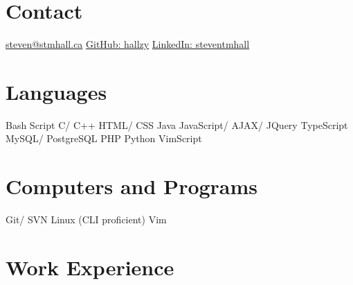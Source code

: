 \documentclass[]{friggeri-cv} %
\begin{document}


\begin{aside} %
\section{Contact}
\href{mailto:steven@stmhall.ca}{steven@stmhall.ca}
\href{http://github.com/hallzy}{GitHub: hallzy}
\href{https://www.linkedin.com/in/steventmhall}{LinkedIn: steventmhall}
\section{Languages}
Bash Script
C/ C++
HTML/ CSS
Java
JavaScript/ AJAX/ JQuery
TypeScript
MySQL/ PostgreSQL
PHP
Python
VimScript
\section{Computers and Programs}
Git/ SVN
Linux (CLI proficient)
Vim
\end{aside}

\section{Work Experience}
\end{document}
